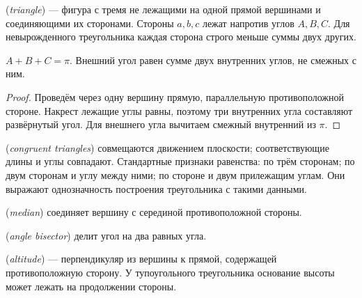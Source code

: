 \ifdim\dimexpr\ht\CatFlowBox+\dp\CatFlowBox\relax<64mm\dp\CatFlowBox=\dimexpr64mm-\ht\CatFlowBox\relax\fi%
\noindent\usebox{\CatFlowBox}\par\addvspace{5pt}
\begin{definition} (\emph{triangle}) — фигура с тремя не лежащими на одной прямой вершинами и соединяющими их сторонами. Стороны \(a,b,c\) лежат напротив углов \(A,B,C\). Для невырожденного треугольника каждая сторона строго меньше суммы двух других.\end{definition}
\begin{theorem}
\(A+B+C=\pi\). Внешний угол равен сумме двух внутренних углов, не смежных с ним.
\end{theorem}
\begin{proof}Проведём через одну вершину прямую, параллельную противоположной стороне. Накрест лежащие углы равны, поэтому три внутренних угла составляют развёрнутый угол. Для внешнего угла вычитаем смежный внутренний из \(\pi\).\end{proof}
\begin{definition} (\emph{congruent triangles}) совмещаются движением плоскости; соответствующие длины и углы совпадают. Стандартные признаки равенства: по трём сторонам; по двум сторонам и углу между ними; по стороне и двум прилежащим углам. Они выражают однозначность построения треугольника с такими данными.\end{definition}
\begin{definition} (\emph{median}) соединяет вершину с серединой противоположной стороны.\end{definition}
\begin{definition} (\emph{angle bisector}) делит угол на два равных угла.\end{definition}
\begin{definition} (\emph{altitude}) — перпендикуляр из вершины к прямой, содержащей противоположную сторону. У тупоугольного треугольника основание высоты может лежать на продолжении стороны.\end{definition}
